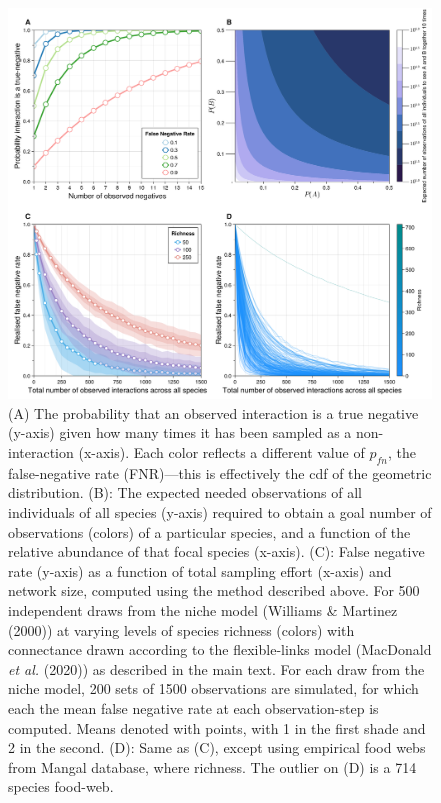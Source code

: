 \documentclass[11pt]{article}
\makeatletter
\def\maxwidth{\ifdim\Gin@nat@width>\linewidth\linewidth
\else\Gin@nat@width\fi}
\let\Oldincludegraphics\includegraphics
\renewcommand{\includegraphics}[1]{\Oldincludegraphics[width=\maxwidth]{#1}}
\makeatother
\begin{document}
\begin{figure}
\hypertarget{fig:geometric}{%
\centering
\includegraphics{./figures/fig1.png}
\caption{(A) The probability that an observed interaction is a true
negative (y-axis) given how many times it has been sampled as a
non-interaction (x-axis). Each color reflects a different value of
\(p_{fn}\), the false-negative rate (FNR)---this is effectively the cdf
of the geometric distribution. (B): The expected needed observations of
all individuals of all species (y-axis) required to obtain a goal number
of observations (colors) of a particular species, and a function of the
relative abundance of that focal species (x-axis). (C): False negative
rate (y-axis) as a function of total sampling effort (x-axis) and
network size, computed using the method described above. For 500
independent draws from the niche model (Williams \& Martinez (2000)) at
varying levels of species richness (colors) with connectance drawn
according to the flexible-links model (MacDonald \emph{et al.} (2020))
as described in the main text. For each draw from the niche model, 200
sets of 1500 observations are simulated, for which each the mean false
negative rate at each observation-step is computed. Means denoted with
points, with 1 in the first shade and 2 in the second. (D): Same as (C),
except using empirical food webs from Mangal database, where richness.
The outlier on (D) is a 714 species food-web.}\label{fig:geometric}
}
\end{figure}
\end{document}
